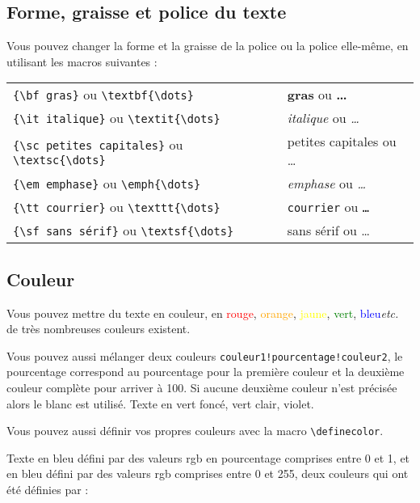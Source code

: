\documentclass{rapport}
\def\etc{\textit{etc.}\xspace}
\begin{document}
      \subsection{Forme, graisse et police du texte}
        Vous pouvez changer la forme et la graisse de la police ou la police elle-même, en utilisant les macros suivantes :
        
        \begin{tabular}{ll}
          \verb|{\bf gras}| ou \verb|\textbf{\dots}| & {\bf gras} ou \textbf{\dots}\\
          \verb|{\it italique}| ou \verb|\textit{\dots}| & {\it italique} ou \textit{\dots}\\
          \verb|{\sc petites capitales}| ou \verb|\textsc{\dots}| & {\sc petites capitales} ou \textsc{\dots}\\
          \verb|{\em emphase}| ou \verb|\emph{\dots}| & {\em emphase} ou \emph{\dots}\\
          \verb|{\tt courrier}| ou \verb|\texttt{\dots}| & {\tt courrier} ou \texttt{\dots}\\
          \verb|{\sf sans sérif}| ou \verb|\textsf{\dots}| & {\sf sans sérif} ou \textsf{\dots}
        \end{tabular}
        
      \subsection{Couleur}
        
        Vous pouvez mettre du texte en couleur, en \textcolor{red}{rouge}, \textcolor{orange}{orange}, \textcolor{yellow}{jaune}, \textcolor{green}{vert}, \textcolor{blue}{bleu}\etc de très nombreuses couleurs existent.
        
        Vous pouvez aussi mélanger deux couleurs \texttt{couleur1!pourcentage!couleur2}, le pourcentage correspond au pourcentage pour la première couleur et la deuxième couleur complète pour arriver à 100. Si aucune deuxième couleur n'est précisée alors le blanc est utilisé. Texte en \textcolor{green!40!black}{vert foncé}, \textcolor{green!60}{vert clair}, \textcolor{blue!50!red}{violet}.
        
        Vous pouvez aussi définir vos propres couleurs avec la macro \verb|\definecolor|.
        
        
        Texte en \textcolor{bleu}{bleu} défini par des valeurs rgb en pourcentage comprises entre 0 et 1, et en \textcolor{bleu2}{bleu} défini par des valeurs rgb comprises entre 0 et 255, deux couleurs qui ont été définies par :
        
\end{document}

